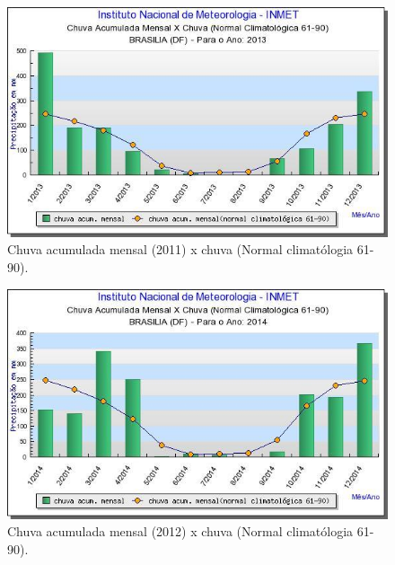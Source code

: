 \begin{figure}[H]
	 \centering
	\label{Chuva acumulada mensal (2013) x chuva (Normal climatólogia 61-90)}
	 \includegraphics[scale=0.6]{captacao/3.jpg}
	 \caption{Chuva acumulada mensal (2011) x chuva (Normal climatólogia 61-90)\cite{INMET}.}
\end{figure}
 
 
\begin{figure}[H]
	 \centering
	\label{Chuva acumulada mensal (2014) x chuva (Normal climatólogia 61-90)}
	 \includegraphics[scale=0.6]{captacao/4.jpg}
	 \caption{Chuva acumulada mensal (2012) x chuva (Normal climatólogia 61-90)\cite{INMET}.}
\end{figure}

